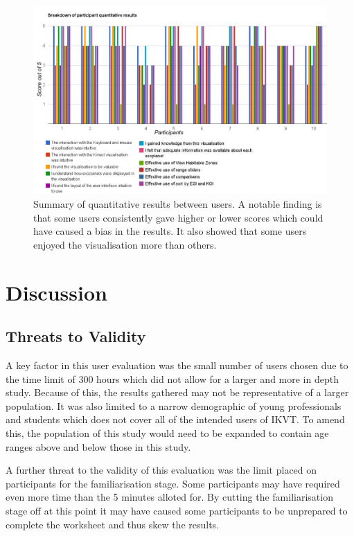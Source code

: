 \begin{figure}[H]

\includegraphics[width=1.3\textwidth,angle=90]{images/breakdown.pdf}
  \caption[Summary quantitative results]{Summary of quantitative results between
users. A notable finding is that some users consistently gave higher or lower
scores
which could have caused a bias in the results. It also showed that some users
enjoyed the visualisation more than others.}  
    \label{fig:breakdown}
\end{figure}



\section{Discussion}
\subsection{Threats to Validity}
A key factor in this user evaluation was the small number of users
chosen due to the time limit of 300 hours which did not allow for a larger and
more
in depth study. Because of this, the results gathered may
not be representative of a larger population. It was also limited to a narrow
demographic of young professionals and students which does not cover all of the
intended users of IKVT. To amend this, the population of this study would need
to
be expanded to contain age ranges above and below those in this study.

A further threat to the validity of this evaluation was the limit placed on
participants for the familiarisation stage. Some participants may have required
even more time than the 5 minutes alloted for. By cutting the familiarisation
stage off at this point it may have caused some participants to be unprepared
to complete the worksheet and thus skew the results.

